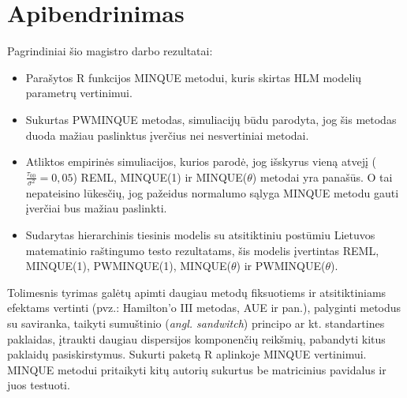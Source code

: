 \documentclass[12pt,a4paper]{article}
\begin{document}
\section*{Apibendrinimas}
\indent Pagrindiniai šio magistro darbo rezultatai:
\begin{itemize}
\item Parašytos R funkcijos MINQUE metodui, kuris skirtas HLM modelių parametrų vertinimui.
\item Sukurtas PWMINQUE metodas, simuliacijų būdu parodyta, jog šis metodas duoda mažiau paslinktus įverčius nei nesvertiniai metodai.
\item Atliktos empirinės simuliacijos, kurios parodė, jog išskyrus vieną atvejį ($\frac{\tau_{00}}{\sigma^2}=0,05$) REML, MINQUE(1) ir MINQUE($\theta$) metodai yra panašūs. O tai nepateisino lūkesčių, jog pažeidus normalumo sąlyga MINQUE metodu gauti įverčiai bus mažiau paslinkti.
\item Sudarytas hierarchinis tiesinis modelis su atsitiktiniu postūmiu Lietuvos matematinio raštingumo testo rezultatams, šis modelis įvertintas REML, MINQUE(1), PWMINQUE(1), MINQUE($\theta$) ir PWMINQUE($\theta$).
\end{itemize}

\indent Tolimesnis tyrimas galėtų apimti daugiau metodų fiksuotiems ir atsitiktiniams efektams vertinti (pvz.: Hamilton'o III metodas, AUE ir pan.), palyginti metodus su saviranka, taikyti sumuštinio (\textit{angl. sandwitch}) principo ar kt. standartines paklaidas, įtraukti daugiau dispersijos komponenčių reikšmių, pabandyti kitus paklaidų pasiskirstymus. Sukurti paketą R aplinkoje MINQUE vertinimui. MINQUE metodui pritaikyti kitų autorių sukurtus be matricinius pavidalus ir juos testuoti.
\end{document}
